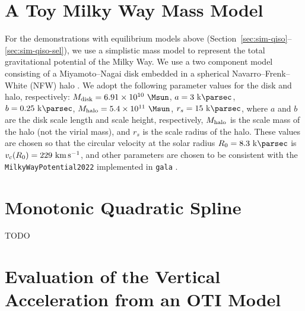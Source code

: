 \appendix

\section{A Toy Milky Way Mass Model}
\label{sec:appendix-potential}

For the demonstrations with equilibrium models above
(Section~\ref{sec:sim-qiso}--\ref{sec:sim-qiso-sel}), we use a simplistic mass model to
represent the total gravitational potential of the Milky Way.
We use a two component model consisting of a Miyamoto--Nagai disk \citep{Miyamoto:1975}
embedded in a spherical Navarro--Frenk--White (NFW) halo \citep{Navarro:1997}.
We adopt the following parameter values for the disk and halo, respectively: $M_{\rm
disk} = 6.91\times 10^{10}~\unit{\Msun}$, $a = 3~\kpc$, $b = 0.25~\kpc$, $M_{\rm halo} =
5.4\times 10^{11}~\unit{\Msun}$, $r_s = 15~\kpc$, where $a$ and $b$ are the disk scale
length and scale height, respectively, $M_{\rm halo}$ is the scale mass of the halo (not
the virial mass), and $r_s$ is the scale radius of the halo.
These values are chosen so that the circular velocity at the solar radius $R_0 =
8.3~\kpc$ is $v_c(R_0) = 229~\kms$, and other parameters are chosen to be consistent
with the \texttt{MilkyWayPotential2022} implemented in \texttt{gala} \citep{gala}.


\section{Monotonic Quadratic Spline}
\label{sec:appendix-spline}

TODO

\section{Evaluation of the Vertical Acceleration from an OTI Model}
\label{sec:appendix-az}

